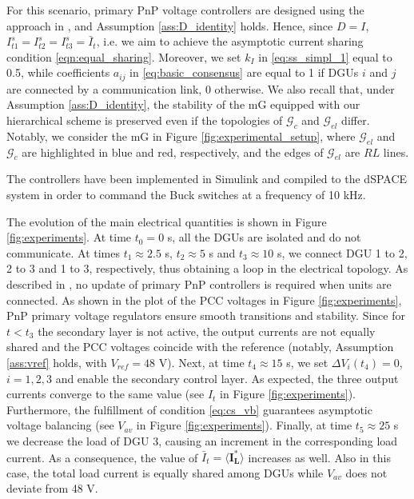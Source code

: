 \documentclass[a4paper]{article}
\theoremstyle{plain}
\begin{document}
For this scenario, primary PnP voltage controllers are designed using the approach in \cite{tucci2016improved}, and Assumption \ref{ass:D_identity} holds. Hence, since $D = I$, $I_{t1}^s = I_{t2}^s = I_{t3}^s = \bar{I}_t$, i.e. we aim to achieve the asymptotic current sharing condition \eqref{eqn:equal_sharing}. Moreover, we set $k_I$ in \eqref{eq:ss_simpl_1} equal to 0.5, while coefficients $a_{ij}$ in \eqref{eq:basic_consensus} are equal to 1 if DGUs $i$ and $j$ are connected by a communication link, 0 otherwise. We also recall that, under Assumption \ref{ass:D_identity}, the stability of the mG equipped with our hierarchical scheme is preserved even if the topologies of $\mathcal{G}_c$ and $\mathcal{G}_{el}$ differ. Notably, we consider the mG in Figure \ref{fig:experimental_setup}, where $\mathcal{G}_{el}$ and $\mathcal{G}_{c}$ are highlighted in blue and red, respectively, and the edges of $\mathcal{G}_{el}$ are $RL$ lines.
	
The controllers have been implemented in Simulink and compiled to the dSPACE system in order to command the Buck switches at a frequency of 10 kHz.

The evolution of the main electrical quantities is shown in Figure \ref{fig:experiments}. At time $t_0 = 0$ s, all the DGUs are isolated and do not communicate. At times $t_1\approx 2.5$ s, $t_2\approx 5$ s and $t_3\approx 10$ s, we connect DGU 1 to 2, 2 to 3 and 1 to 3, respectively, thus obtaining a loop in the electrical topology. As described in \cite{tucci2016improved}, no update of primary PnP controllers is required when units are connected. As shown in the plot of the PCC voltages in Figure \ref{fig:experiments}, PnP primary voltage regulators ensure smooth transitions and stability. Since for $t < t_3$ the secondary layer is not active, the output currents are not equally shared and the PCC voltages coincide with the reference (notably, Assumption \ref{ass:vref} holds, with $V_{ref} = 48$ V). Next, at time $t_4\approx 15$ s, we set $\Delta V_i(t_{4}) = 0$, $i =
1,2,3$ and enable the secondary control layer. As expected, the three output currents converge to the same value (see $I_{t}$ in Figure \ref{fig:experiments}). Furthermore, the fulfillment of condition \eqref{eq:cs_vb} guarantees asymptotic voltage balancing (see $V_{av}$ in Figure \ref{fig:experiments}). Finally, at time $t_5\approx 25$ s we decrease the load of DGU 3, causing an increment in the corresponding load current. As a consequence, the value of $\bar {I}_{t} = \langle\mathbf{{I}_L^*}\rangle$ increases as well. Also in this case, the total load current is equally shared among DGUs while $V_{av}$ does not deviate from 48 V.
\end{document}

